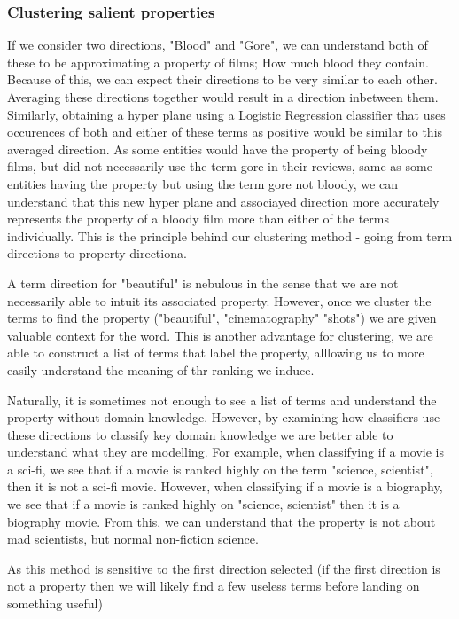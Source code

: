 \subsubsection{Clustering salient properties}

If we consider two directions, "Blood" and "Gore", we can understand both of these to be approximating a property of films; How much blood they contain. Because of this, we can expect their directions to be very similar to each other. Averaging these directions together would result in a direction inbetween them. Similarly, obtaining a hyper plane using a Logistic Regression classifier that uses occurences of both and either of these terms as positive would be similar to this averaged direction. As some entities would have the property of being bloody films, but did not necessarily use the term gore in their reviews, same as some entities having the property but using the term gore not bloody, we can understand that this new hyper plane and associayed direction more accurately represents the property of a bloody film more than either of the terms individually. This is the principle behind our clustering method - going from term directions to property directiona.

A term direction for "beautiful" is nebulous in the sense that we are not necessarily able to intuit its associated property. However, once we cluster the terms to find the property ("beautiful", "cinematography" "shots") we are given valuable context for the word. This is another advantage for clustering, we are able to construct a list of terms that label the property, alllowing us to more easily understand the meaning of thr ranking we induce.

Naturally, it is sometimes not enough to see a list of terms and understand the property without domain knowledge. However, by examining how classifiers use these directions to classify key domain knowledge we are better able to understand what they are modelling. For example, when classifying if a movie is a sci-fi, we see that if a movie is ranked highly on the term "science, scientist", then it is not a sci-fi movie. However, when classifying if a movie is a biography, we see that if a movie is ranked highly on "science, scientist" then it is a biography movie. From this, we can understand that the property is not about mad scientists, but normal non-fiction science. 

As this method is sensitive to the first direction selected (if the first direction is not a property then we will likely find a few useless terms before landing on something useful) %

